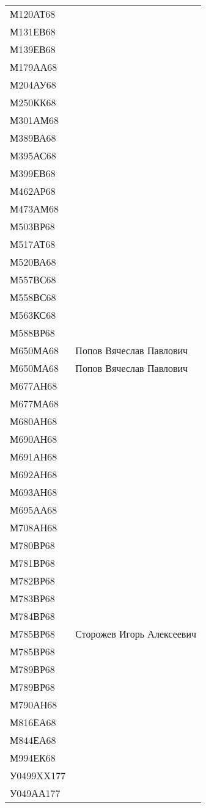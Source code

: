 \documentclass[a4paper,12pt]{article}
\begin{document}
\begin{longtable}{ ll }
М120АТ68 &  \\ 
М131ЕВ68 &  \\ 
М139ЕВ68 &  \\ 
М179АА68 &  \\ 
М204АУ68 &  \\ 
М250КК68 &  \\ 
М301АМ68 &  \\ 
М389ВА68 &  \\ 
М395АС68 &  \\ 
М399ЕВ68 &  \\ 
М462АР68 &  \\ 
М473АМ68 &  \\ 
М503ВР68 &  \\ 
М517АТ68 &  \\ 
М520ВА68 &  \\ 
М557ВС68 &  \\ 
М558ВС68 &  \\ 
М563КС68 &  \\ 
М588ВР68 &  \\ 
М650МА68 & Попов Вячеслав Павлович \\ 
М650МА68 & Попов Вячеслав Павлович \\ 
М677АН68 &  \\ 
М677МА68 &  \\ 
М680АН68 &  \\ 
М690АН68 &  \\ 
М691АН68 &  \\ 
М692АН68 &  \\ 
М693АН68 &  \\ 
М695АА68 &  \\ 
М708АН68 &  \\ 
М780ВР68 &  \\ 
М781ВР68 &  \\ 
М782ВР68 &  \\ 
М783ВР68 &  \\ 
М784ВР68 &  \\ 
М785ВР68 & Сторожев Игорь Алексеевич \\ 
М785ВР68 &  \\ 
М789ВР68 &  \\ 
М789ВР68 &  \\ 
М790АН68 &  \\ 
М816ЕА68 &  \\ 
М844ЕА68 &  \\ 
М994ЕК68 &  \\ 
У0499XX177 &  \\ 
У049АА177 &  \\ 
\bottomrule
\end{longtable}
\end{document}
